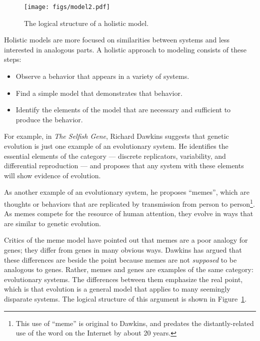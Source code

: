 \documentclass[12pt]{book}
\theoremstyle{exercise}
\begin{document}

\begin{figure}
\centerline{\texttt{[image: figs/model2.pdf]}}
\caption{The logical structure of a holistic model.\label{fig.model2}}
\end{figure}

Holistic models are more focused on similarities between systems and
less interested in analogous parts.  A holistic approach to modeling
consists of these steps:


\begin{itemize}

\item Observe a behavior that appears in a variety of systems.

\item Find a simple model that demonstrates that behavior.

\item Identify the elements of the model that are necessary and
sufficient to produce the behavior.

\end{itemize}

For example, in {\em The Selfish Gene}, Richard Dawkins suggests that
genetic evolution is just one example of an evolutionary system.  He
identifies the essential elements of the category --- discrete
replicators, variability, and differential reproduction --- and proposes
that any system with these elements will show evidence of evolution.


As another example of an evolutionary system, he proposes ``memes'',
which are thoughts or behaviors that are replicated by transmission
from person to person\footnote{This use of ``meme'' is original to
  Dawkins, and predates the distantly-related use of the word on the
  Internet by about 20 years.}.  As memes compete for the resource of
human attention, they evolve in ways that are similar to genetic
evolution.


Critics of the meme model have pointed out that
memes are a poor analogy for genes; they differ from genes in many
obvious ways.  Dawkins has argued that these differences are
beside the point because memes are not {\em supposed} to be analogous
to genes.  Rather, memes and genes are examples of the same
category: evolutionary systems.  The differences between them
emphasize the real point, which is that evolution is a general model
that applies to many seemingly disparate systems.  The logical
structure of this argument is shown in Figure~\ref{fig.model2}.
\end{document}
